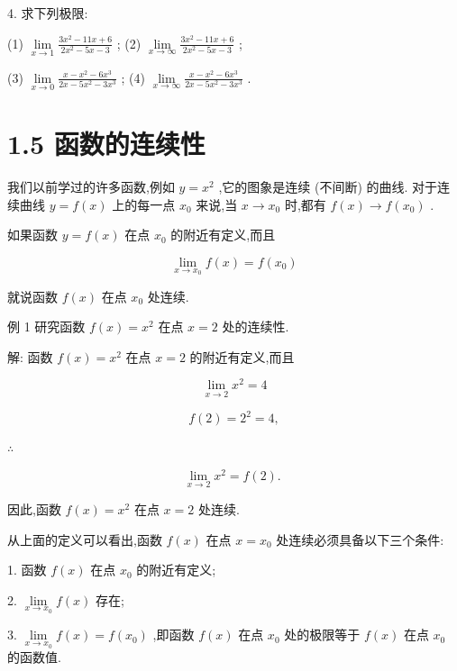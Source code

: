 \documentclass[10pt]{article}
\begin{document}
4. 求下列极限:

(1) \(\mathop{\lim }\limits_{{x \rightarrow 1}}\frac{3{x}^{2} - {11x} + 6}{2{x}^{2} - {5x} - 3}\) ; (2) \(\mathop{\lim }\limits_{{x \rightarrow \infty }}\frac{3{x}^{2} - {11x} + 6}{2{x}^{2} - {5x} - 3}\) ;

(3) \(\mathop{\lim }\limits_{{x \rightarrow 0}}\frac{x - {x}^{2} - 6{x}^{3}}{{2x} - 5{x}^{2} - 3{x}^{3}}\) ; (4) \(\mathop{\lim }\limits_{{x \rightarrow \infty }}\frac{x - {x}^{2} - 6{x}^{3}}{{2x} - 5{x}^{2} - 3{x}^{3}}\) .

\section*{1.5 函数的连续性}

我们以前学过的许多函数,例如 \(y = {x}^{2}\) ,它的图象是连续 (不间断) 的曲线. 对于连续曲线 \(y = f\left( x\right)\) 上的每一点 \({x}_{0}\) 来说,当 \(x \rightarrow {x}_{0}\) 时,都有 \(f\left( x\right) \rightarrow f\left( {x}_{0}\right)\) .

如果函数 \(y = f\left( x\right)\) 在点 \({x}_{0}\) 的附近有定义,而且

\[
\mathop{\lim }\limits_{{x \rightarrow {x}_{0}}}f\left( x\right) = f\left( {x}_{0}\right)
\]

就说函数 \(f\left( x\right)\) 在点 \({x}_{0}\) 处连续.

例 1 研究函数 \(f\left( x\right) = {x}^{2}\) 在点 \(x = 2\) 处的连续性.

解: 函数 \(f\left( x\right) = {x}^{2}\) 在点 \(x = 2\) 的附近有定义,而且

\[
\mathop{\lim }\limits_{{x \rightarrow 2}}{x}^{2} = 4
\]

\[
f\left( 2\right) = {2}^{2} = 4,
\]

\(\therefore\)

\[
\mathop{\lim }\limits_{{x \rightarrow 2}}{x}^{2} = f\left( 2\right) \text{. }
\]

因此,函数 \(f\left( x\right) = {x}^{2}\) 在点 \(x = 2\) 处连续.

从上面的定义可以看出,函数 \(f\left( x\right)\) 在点 \(x = {x}_{0}\) 处连续必须具备以下三个条件:

1. 函数 \(f\left( x\right)\) 在点 \({x}_{0}\) 的附近有定义;

2. \(\mathop{\lim }\limits_{{x \rightarrow {x}_{0}}}f\left( x\right)\) 存在;

3. \(\mathop{\lim }\limits_{{x \rightarrow {x}_{0}}}f\left( x\right) = f\left( {x}_{0}\right)\) ,即函数 \(f\left( x\right)\) 在点 \({x}_{0}\) 处的极限等于 \(f\left( x\right)\) 在点 \({x}_{0}\) 的函数值.
\end{document}
